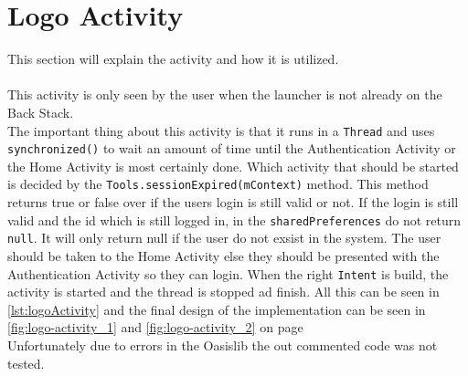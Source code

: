 \section{Logo Activity}
This section will explain the activity  and how it is utilized.\\\\
This activity is only seen by the user when the launcher is not already on the Back Stack.\\
The important thing about this activity is that it runs in a \verb+Thread+ and uses \verb+synchronized()+ to wait an amount of time until the Authentication Activity or the Home Activity is most certainly done. Which activity that should be started is decided by the \verb+Tools.sessionExpired(mContext)+ method. 
This method returns true or false over if the users login is still valid or not. If the login is still valid and the id which is still logged in, in the \verb+sharedPreferences+ do not return \verb+null+.
It will only return null if the user do not exsist in the system. The user should be taken to the Home Activity else they should be presented with the Authentication Activity so they can login.
When the right \verb+Intent+ is build, the activity is started and the thread is stopped ad finish.
All this can be seen in \autoref{lst:logoActivity} and the final design of the implementation can be seen in \autoref{fig:logo-activity_1} and \autoref{fig:logo-activity_2} on page \\
Unfortunately due to errors in the Oasislib the out commented code was not tested.

